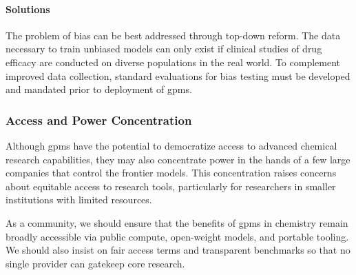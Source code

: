 \paragraph{Solutions} The problem of bias can be best addressed through top-down reform. 
The data necessary to train unbiased models can only exist if clinical studies of drug efficacy are conducted on diverse populations in the real world.\autocite{criado-perez2019invisible} 
To complement improved data collection, standard evaluations for bias testing must be developed and mandated prior to deployment of \glspl{gpm}.


\subsubsection{Access and Power Concentration} 

Although \glspl{gpm} have the potential to democratize access to advanced chemical research capabilities, they may also concentrate power in the hands of a few large companies that control the frontier models. 
This concentration raises concerns about equitable access to research tools, particularly for researchers in smaller institutions with limited resources.\autocite{satariano2025a1i1}

As a community, we should ensure that the benefits of \glspl{gpm} in chemistry remain broadly accessible via public compute, open-weight models, and portable tooling. We should also insist on fair access terms and transparent benchmarks so that no single provider can gatekeep core research.



